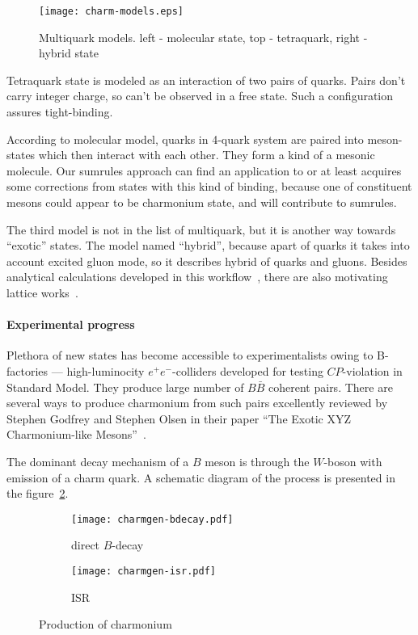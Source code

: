 \begin{figure}[H]
    \centering
    \texttt{[image: charm-models.eps]}
    \caption{Multiquark models. left - molecular state, top - tetraquark, right - hybrid state\label{fig:charm-models}}
\end{figure}

Tetraquark state is modeled as an interaction of two pairs of quarks. Pairs don't carry integer charge, so can't be observed in a free state. Such a configuration assures tight-binding.

According to molecular model, quarks in 4-quark system are paired into meson-states which then interact with each other. They form a kind of a mesonic molecule. Our sumrules approach can find an application to or at least acquires some corrections from states with this kind of binding, because one of constituent mesons could appear to be charmonium state, and will contribute to sumrules.

The third model is not in the list of multiquark, but it is another way towards ``exotic'' states. The model named ``hybrid'', because apart of quarks it takes into account excited gluon mode, so it describes hybrid of quarks and gluons. Besides analytical calculations developed in this workflow~\cite{hybrid-th}, there are also motivating lattice works~\cite{hybrid-lattice1, hybrid-lattice2}. 

\paragraph{Experimental progress}
Plethora of new states has become accessible to experimentalists owing to B-factories --- high-luminocity $e^+ e^-$-colliders developed for testing $CP$-violation in Standard Model. They produce large number of $B\bar{B}$ coherent pairs. There are several ways to produce charmonium from such pairs excellently reviewed by Stephen Godfrey and Stephen Olsen in their paper ``The Exotic XYZ Charmonium-like Mesons''~\cite{godfrey-olsen}.

The dominant decay mechanism of a $B$ meson is through the $W$-boson with emission of a charm quark. A schematic diagram of the process is presented in the figure~\cref{fig:charmgen-bdecay}.

\begin{figure}[H]
    \centering
    \begin{subfigure}[b]{0.4\textwidth}
        \texttt{[image: charmgen-bdecay.pdf]}
        \caption{direct $B$-decay} \label{fig:charmgen-bdecay}
    \end{subfigure}
    \begin{subfigure}[b]{0.4\textwidth}
        \texttt{[image: charmgen-isr.pdf]}
        \caption{ISR} \label{fig:charmgen-isr}
    \end{subfigure}
    \caption{Production of charmonium}
\end{figure}

